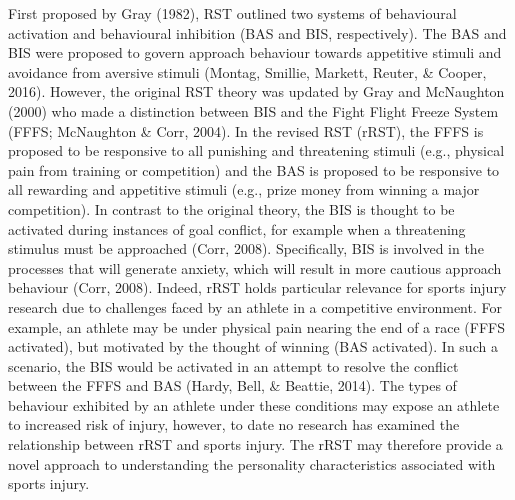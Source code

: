 \documentclass[man,floatsintext]{apa6}
\begin{document}
First proposed by Gray (1982), RST outlined two systems of behavioural activation and behavioural inhibition (BAS and BIS, respectively).
The BAS and BIS were proposed to govern approach behaviour towards appetitive stimuli and avoidance from aversive stimuli (Montag, Smillie, Markett, Reuter, \& Cooper, 2016).
However, the original RST theory was updated by Gray and McNaughton (2000) who made a distinction between BIS and the Fight Flight Freeze System (FFFS; McNaughton \& Corr, 2004).
In the revised RST (rRST), the FFFS is proposed to be responsive to all punishing and threatening stimuli (e.g., physical pain from training or competition) and the BAS is proposed to be responsive to all rewarding and appetitive stimuli (e.g., prize money from winning a major competition).
In contrast to the original theory, the BIS is thought to be activated during instances of goal conflict, for example when a threatening stimulus must be approached (Corr, 2008).
Specifically, BIS is involved in the processes that will generate anxiety, which will result in more cautious approach behaviour (Corr, 2008).
Indeed, rRST holds particular relevance for sports injury research due to challenges faced by an athlete in a competitive environment.
For example, an athlete may be under physical pain nearing the end of a race (FFFS activated), but motivated by the thought of winning (BAS activated).
In such a scenario, the BIS would be activated in an attempt to resolve the conflict between the FFFS and BAS (Hardy, Bell, \& Beattie, 2014).
The types of behaviour exhibited by an athlete under these conditions may expose an athlete to increased risk of injury, however, to date no research has examined the relationship between rRST and sports injury.
The rRST may therefore provide a novel approach to understanding the personality characteristics associated with sports injury.
\end{document}
